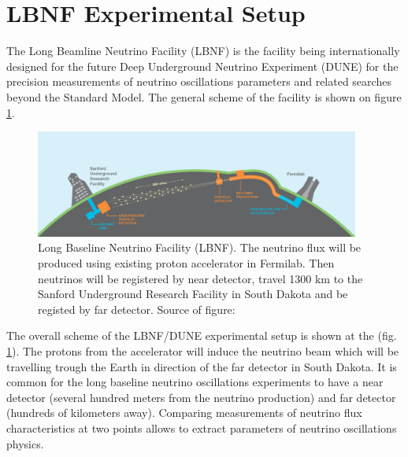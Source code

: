 
\section{LBNF Experimental Setup}

The Long Beamline Neutrino Facility (LBNF) is the facility being internationally designed for the future Deep Underground Neutrino Experiment (DUNE) for the precision measurements of neutrino oscillations parameters and related searches beyond the Standard Model. The general scheme of the facility is shown on figure \ref{fig:LBNF_overallScheme}. 


\begin{figure}
\caption{Long Baseline Neutrino Facility (LBNF). The neutrino flux will be produced using existing proton accelerator in Fermilab. Then neutrinos will be registered by near detector, travel 1300 km to the Sanford Underground Research Facility in South Dakota and be registed by far detector. Source of figure: \cite{ref_LBNFweb} }
\label{fig:LBNF_overallScheme}
\centering
\includegraphics[width=0.95\textwidth, keepaspectratio=true]{figs/LBNF_overallScheme.png} 
\end{figure}

The overall scheme of the LBNF/DUNE experimental setup is shown at the (fig. \ref{fig:LBNF_overallScheme}). The protons from the accelerator  will induce the neutrino beam which will be travelling trough the Earth in direction of the far detector in South Dakota. It is common for the long baseline neutrino oscillations experiments to have a near detector (several hundred meters from the neutrino production) and far detector (hundreds of kilometers away). Comparing measurements of neutrino flux characteristics at two points allows to extract parameters of neutrino oscillations physics.






